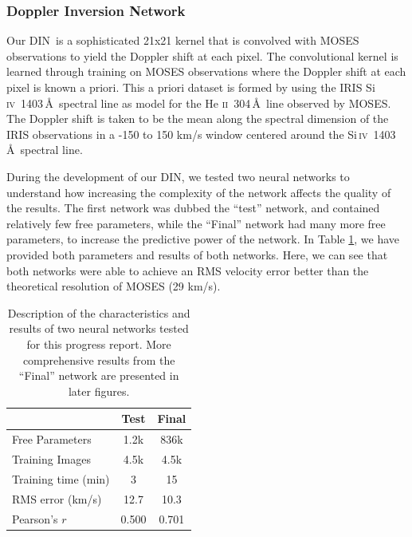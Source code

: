 \documentclass[10pt,letterpaper]{article}
\newcommand{\SiIV}{Si\,\textsc{iv}~1403\,\AA}
\newcommand{\HeII}{He \textsc{ii}~304\,\AA}
\newcommand{\MOSES}{\ac{MOSES}}
\newcommand{\DIN}{\ac{DIN}}
\begin{document}
			\subsubsection{Doppler Inversion Network}
				
				Our \DIN\ is a sophisticated 21x21 kernel that is convolved with MOSES observations to yield the Doppler shift at each pixel.
				The convolutional kernel is learned through training on MOSES observations where the Doppler shift at each pixel is known a priori.
				This a priori dataset is formed by using the IRIS \SiIV\ spectral line as model for the \HeII\ line observed by \MOSES.
				The Doppler shift is taken to be the mean along the spectral dimension of the IRIS observations in a -150 to 150 km/s window centered around the \SiIV\ spectral line.
				
				During the development of our \DIN, we tested two neural networks to understand how increasing the complexity of the network affects the quality of the results.
				The first network was dubbed the ``test'' network, and contained relatively few free parameters, while the ``Final'' network had many more free parameters, to increase the predictive power of the network.
				In Table \ref{nn_table}, we have provided both parameters and results of both networks.
				Here, we can see that both networks were able to achieve an RMS velocity error better than the theoretical resolution of MOSES (29 km/s).
				
				\begin{table}[h!]
					
					\centering
					\begin{tabular}{| l | c c |}
						\hline
						& Test & Final \\ \hline
						Free Parameters & 1.2k & 836k \\
						Training Images & 4.5k & 4.5k \\				
						Training time (min) & 3 & 15 \\ 
						RMS error (km/s) & 12.7 & 10.3 \\
						Pearson's $r$ & 0.500 & 0.701 \\ \hline				
					\end{tabular}					
					\caption{Description of the characteristics and results of two neural networks tested for this progress report. More comprehensive results from the ``Final'' network are presented in later figures.}
					\label{nn_table}
					
				\end{table}
				
\end{document}
